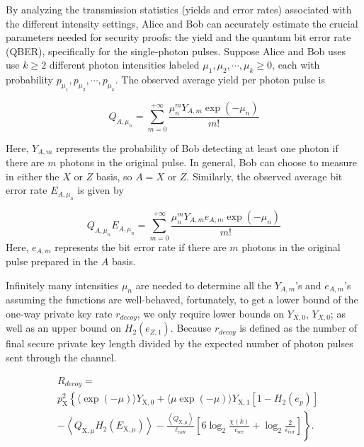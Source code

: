 \documentclass[%
 reprint,
superscriptaddress,
 amsmath,amssymb,
 aps,
]{revtex4-2}
\begin{document}
By analyzing the transmission statistics (yields and error rates) associated with the different intensity settings, Alice and Bob can accurately estimate the crucial parameters needed for security proofs: the yield and the quantum bit error rate (QBER), specifically for the single-photon pulses. Suppose Alice and Bob uses use $k\ge2$ different photon intensities labeled $\mu_1, \mu_2, \cdots, \mu_k \ge 0$, each with probability $p_{\mu_1}, p_{\mu_2}, \cdots, p_{\mu_k}$. The observed average yield per photon pulse is

\begin{equation}
    Q_{A, \mu_n} = \sum_{m=0}^{+\infty}\frac{\mu_n^mY_{A, m}\exp{(-\mu_n)}}{m!}
\end{equation}

Here, $Y_{A, m}$ represents the probability of Bob detecting at least one photon if there are $m$ photons in the original pulse. In general, Bob can choose to measure in either the $X$ or $Z$ basis, so $A=X$ or $Z$. Similarly, the observed average bit error rate $E_{A,\mu_n}$ is given by

\begin{equation}
    Q_{A, \mu_n} E_{A, \mu_n} = \sum_{m=0}^{+\infty}\frac{\mu_n^mY_{A, m}e_{A, m}\exp{(-\mu_n)}}{m!}
\end{equation}
Here, $e_{A, m}$ represents the bit error rate if there are $m$ photons in the original pulse prepared in the $A$ basis.

Infinitely many intensities $\mu_n$ are needed to determine all the $Y_{A, m}$’s and $e_{A, m}$’s assuming the functions are well-behaved, fortunately, to get a lower bound of the one-way private key rate $r_{decoy}$, we only require lower bounds on $Y_{X, 0}$, $Y_{X, 0}$; as well as an upper bound on $H_2(e_{Z, 1})$. Because $r_{decoy}$ is defined as the number of final secure private key length divided by the expected number of photon pulses sent through the channel.

\begin{equation}
    \begin{aligned}
&R_{decoy}=\\
&p_{\mathrm{X}}^2\left\{\langle\exp (-\mu)\rangle Y_{\mathrm{X}, 0}+\langle\mu \exp (-\mu)\rangle Y_{\mathrm{X}, 1}\left[1-H_2\left(e_p\right)\right]\right. \\
& \left.-\left\langle Q_{\mathrm{X}, \mu} H_2\left(E_{\mathrm{X}, \mu}\right)\right\rangle-\frac{\left\langle Q_{\mathrm{X}, \mu}\right\rangle}{\ell_{\mathrm{raw}}}\left[6 \log _2 \frac{\chi(k)}{\epsilon_{\mathrm{sec}}}+\log _2 \frac{2}{\epsilon_{\mathrm{cor}}}\right]\right\} .
\end{aligned}
\end{equation}
\end{document}
